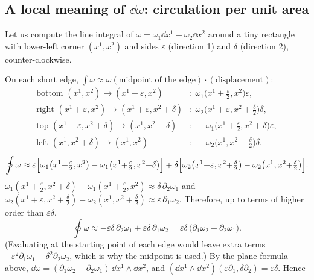 \subsection{A local meaning of $\dd\omega$: circulation per unit area}\label{sec:circulation}

Let us compute the line integral of $\omega=\omega_1\dd x^1+\omega_2\dd x^2$ around a tiny rectangle with lower-left corner $(x^1,x^2)$ and sides $\varepsilon$ (direction 1) and $\delta$ (direction 2), counter-clockwise.

 On each short edge, $\int\omega\approx\omega(\text{midpoint of the edge})\cdot(\text{displacement})$:
\begin{align*}
\text{bottom }(x^1,x^2)\to(x^1{+}\varepsilon,x^2)&:\ \omega_1\bigl(x^1{+}\tfrac\varepsilon2,x^2\bigr)\varepsilon,\\
\text{right }(x^1{+}\varepsilon,x^2)\to(x^1{+}\varepsilon,x^2{+}\delta)&:\ \omega_2\bigl(x^1{+}\varepsilon,x^2{+}\tfrac\delta2\bigr)\delta,\\
\text{top }(x^1{+}\varepsilon,x^2{+}\delta)\to(x^1,x^2{+}\delta)&:\ -\omega_1\bigl(x^1{+}\tfrac\varepsilon2,x^2{+}\delta\bigr)\varepsilon,\\
\text{left }(x^1,x^2{+}\delta)\to(x^1,x^2)&:\ -\omega_2\bigl(x^1,x^2{+}\tfrac\delta2\bigr)\delta.
\end{align*}
\[
\oint\omega\approx\varepsilon\Bigl[\omega_1\bigl(x^1{+}\tfrac\varepsilon2,x^2\bigr)-\omega_1\bigl(x^1{+}\tfrac\varepsilon2,x^2{+}\delta\bigr)\Bigr]+\delta\Bigl[\omega_2\bigl(x^1{+}\varepsilon,x^2{+}\tfrac\delta2\bigr)-\omega_2\bigl(x^1,x^2{+}\tfrac\delta2\bigr)\Bigr].
\]
 $\omega_1(x^1{+}\frac\varepsilon2,x^2{+}\delta)-\omega_1(x^1{+}\frac\varepsilon2,x^2)\approx\delta\,\partial_2\omega_1$ and $\omega_2(x^1{+}\varepsilon,x^2{+}\frac\delta2)-\omega_2(x^1,x^2{+}\frac\delta2)\approx\varepsilon\,\partial_1\omega_2$. Therefore, up to terms of higher order than $\varepsilon\delta$,
\[
\oint\omega\approx-\varepsilon\delta\,\partial_2\omega_1+\varepsilon\delta\,\partial_1\omega_2=\varepsilon\delta\,\bigl(\partial_1\omega_2-\partial_2\omega_1\bigr).
\]
(Evaluating at the starting point of each edge would leave extra terms $-\varepsilon^2\partial_1\omega_1-\delta^2\partial_2\omega_2$, which is why the midpoint is used.)
 By the plane formula above, $\dd\omega=(\partial_1\omega_2-\partial_2\omega_1)\,\dd x^1\wedge\dd x^2$, and $(\dd x^1\wedge\dd x^2)(\varepsilon\partial_1,\delta\partial_2)=\varepsilon\delta$. Hence
